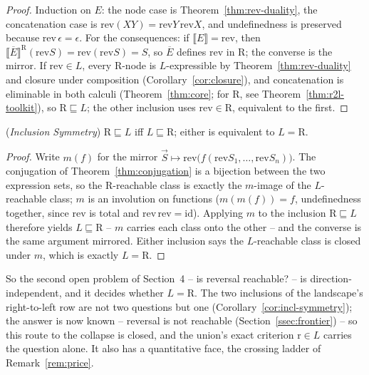 \documentclass[runningheads,envcountsect]{llncs}
\begin{document}
\begin{proof}
    Induction on $E$: the node case is Theorem~\ref{thm:rev-duality}, the concatenation case is $\mathrm{rev}(XY) = \mathrm{rev}Y\,\mathrm{rev}X$, and undefinedness is preserved because $\mathrm{rev}\,\epsilon = \epsilon$. For the consequences: if $\llbracket E \rrbracket = \mathrm{rev}$, then $\llbracket \overline{E} \rrbracket^{\mathrm{R}}(\mathrm{rev}S) = \mathrm{rev}(\mathrm{rev}S) = S$, so $\overline{E}$ defines $\mathrm{rev}$ in $\mathrm{R}$; the converse is the mirror. If $\mathrm{rev} \in L$, every $\mathrm{R}$-node is $L$-expressible by Theorem~\ref{thm:rev-duality} and closure under composition (Corollary~\ref{cor:closure}), and concatenation is eliminable in both calculi (Theorem~\ref{thm:core}; for $\mathrm{R}$, see Theorem~\ref{thm:r2l-toolkit}), so $\mathrm{R} \sqsubseteq L$; the other inclusion uses $\mathrm{rev} \in \mathrm{R}$, equivalent to the first.
\end{proof}

\begin{corollary}
    (\emph{Inclusion Symmetry})
    \label{cor:incl-symmetry}
    $\mathrm{R} \sqsubseteq L$ iff $L \sqsubseteq \mathrm{R}$; either is equivalent to $L = \mathrm{R}$.
\end{corollary}

\begin{proof}
    Write $m(f)$ for the mirror $\vec S \mapsto \mathrm{rev}\big(f(\mathrm{rev}S_1, \dots, \mathrm{rev}S_n)\big)$. The conjugation of Theorem~\ref{thm:conjugation} is a bijection between the two expression sets, so the $\mathrm{R}$-reachable class is exactly the $m$-image of the $L$-reachable class; $m$ is an involution on functions ($m(m(f)) = f$, undefinedness together, since $\mathrm{rev}$ is total and $\mathrm{rev}\,\mathrm{rev} = \mathrm{id}$). Applying $m$ to the inclusion $\mathrm{R} \sqsubseteq L$ therefore yields $L \sqsubseteq \mathrm{R}$ -- $m$ carries each class onto the other -- and the converse is the same argument mirrored. Either inclusion says the $L$-reachable class is closed under $m$, which is exactly $L = \mathrm{R}$.
\end{proof}

So the second open problem of Section~4 -- is reversal reachable? -- is direction-independent, and it decides whether $L = \mathrm{R}$. The two inclusions of the landscape's right-to-left row are not two questions but one (Corollary~\ref{cor:incl-symmetry}); the answer is now known -- reversal is not reachable (Section~\ref{ssec:frontier}) -- so this route to the collapse is closed, and the union's exact criterion $\mathrm{r} \in L$ carries the question alone. It also has a quantitative face, the crossing ladder of Remark~\ref{rem:price}.
\end{document}
